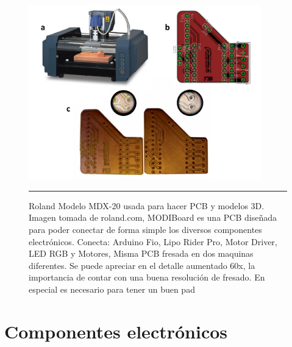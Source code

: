 \begin{figure}[htbp]
	\centering
		\includegraphics[width=0.9\textwidth]{./Figures/modi/pcb.png}
		\rule{35em}{0.5pt}
	\caption[MDX20]{Roland Modelo MDX-20 usada para hacer PCB y modelos 3D. Imagen tomada de roland.com, MODIBoard es una PCB diseñada para poder conectar de forma simple los diversos componentes electrónicos. Conecta: Arduino Fio, Lipo Rider Pro, Motor Driver, LED RGB y Motores, Misma PCB fresada en dos maquinas diferentes. Se puede apreciar en el detalle aumentado 60x, la importancia de contar con una buena resolución de fresado. En especial es necesario para tener un buen pad }
	\label{fig:MDX20}
\end{figure}


\section{Componentes electrónicos}

